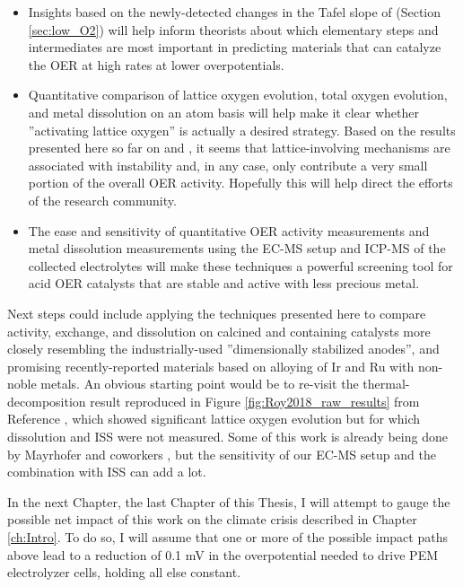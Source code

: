\begin{itemize}
\item Insights based on the newly-detected changes in the Tafel slope of  (Section \ref{sec:low_O2}) will help inform theorists about which elementary steps and intermediates are most important in predicting materials that can catalyze the OER at high rates at lower overpotentials.

\item Quantitative comparison of lattice oxygen evolution, total oxygen evolution, and metal dissolution on an atom basis will help make it clear whether ''activating lattice oxygen'' is actually a desired strategy. Based on the results presented here so far on  and , it seems that lattice-involving mechanisms are associated with instability and, in any case, only contribute a very small portion of the overall OER activity. Hopefully this will help direct the efforts of the research community.

\item The ease and sensitivity of quantitative OER activity measurements and metal dissolution measurements using the EC-MS setup and ICP-MS of the collected electrolytes will make these techniques a powerful screening tool for acid OER catalysts that are stable and active with less precious metal.
\end{itemize}

Next steps could include applying the techniques presented here to compare activity, exchange, and dissolution on calcined  and  containing catalysts more closely resembling the industrially-used ''dimensionally stabilized anodes''\cite{Escudero-Escribano2018}, and promising recently-reported materials based on alloying of Ir and Ru with non-noble metals\cite{Reier2015a, Seitz2016, Diaz-Morales2016a}. An obvious starting point would be to re-visit the thermal-decomposition  result reproduced in Figure \ref{fig:Roy2018_raw_results} from Reference , which showed significant lattice oxygen evolution but for which dissolution and ISS were not measured. Some of this work is already being done by Mayrhofer and coworkers \cite{Geiger2018}, but the sensitivity of our EC-MS setup and the combination with ISS can add a lot.

In the next Chapter, the last Chapter of this Thesis, I will attempt to gauge the possible net impact of this work on the climate crisis described in Chapter \ref{ch:Intro}. To do so, I will assume that one or more of the possible impact paths above lead to a reduction of 0.1 mV in the overpotential needed to drive PEM electrolyzer cells, holding all else constant.